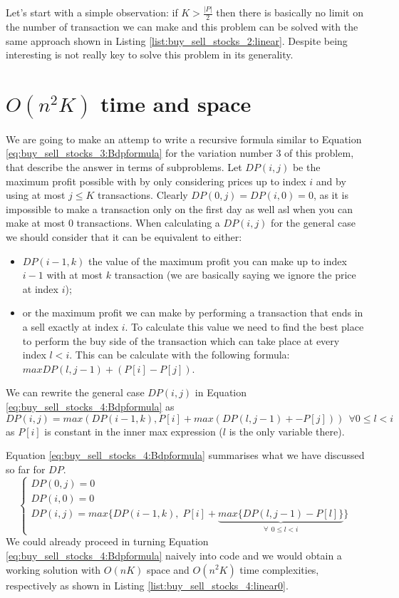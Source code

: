 Let's start with a simple observation: if $K > \frac{|P|}{2}$ then there is basically no limit on the number of transaction we can make and this problem can be solved with the same approach shown in Listing \ref{list:buy_sell_stocks_2:linear}.
Despite being interesting is not really key to solve this problem in its generality.


\section{$O(n^2K)$ time and space}
\label{buy_sell_stocks4:sec:linerartime1}
We are going to make an attemp to write a recursive formula similar to Equation \ref{eq:buy_sell_stocks_3:Bdpformula} for the variation number $3$ of this problem, that describe the answer in terms of subproblems.
Let $DP(i,j)$ be the maximum profit possible with by only considering prices up to index $i$ and by using at most $j \leq K$ transactions.
Clearly $DP(0,j)=DP(i,0)=0$, as it is impossible to make a transaction only on the first day as well asl when you can make at most $0$ transactions.
When calculating a $DP(i,j)$ for the general case we should consider that it can be equivalent to either:
\begin{itemize}
	\item $DP(i-1,k)$ the value of the maximum profit you can make up to index $i-1$ with at most $k$ transaction (we are basically saying we ignore the price at index $i$);
	\item or the maximum profit we can make by performing a transaction that ends in a sell exactly at index $i$. To calculate this value we need to find the best place to perform the buy side of the transaction which can take place at every index $l < i$. This can be calculate with the following formula: $max DP(l,j-1) + (P[i]-P[j])$.
\end{itemize}
We can rewrite the general case $DP(i,j)$ in Equation \ref{eq:buy_sell_stocks_4:Bdpformula} as 
$$DP(i,j) = max(DP(i-1,k), P[i] + max(DP(l,j-1)+-P[j])) \: \: \forall 0 \leq l < i$$ as $P[i]$ is constant in the inner max expression ($l$ is the only variable there).

Equation \ref{eq:buy_sell_stocks_4:Bdpformula} summarises what we have discussed so far for $DP$.
\begin{equation}
    \begin{cases}
        DP(0,j) = 0 \\
        DP(i,0) = 0 \\
		DP(i,j) = max\Big\{DP(i-1,k), \; P[i] + \underbrace{max\big\{DP(l,j-1)-P[l]\big\}}_{\forall \: \: 0 \leq l < i}\Big\}
     \end{cases}
    \label{eq:buy_sell_stocks_4:Bdpformula}
\end{equation}
We could already proceed in turning Equation \ref{eq:buy_sell_stocks_4:Bdpformula} naively into code and we would obtain a working solution with $O(nK)$ space and $O(n^2K)$ time complexities, respectively as shown in Listing \ref{list:buy_sell_stocks_4:linear0}.


